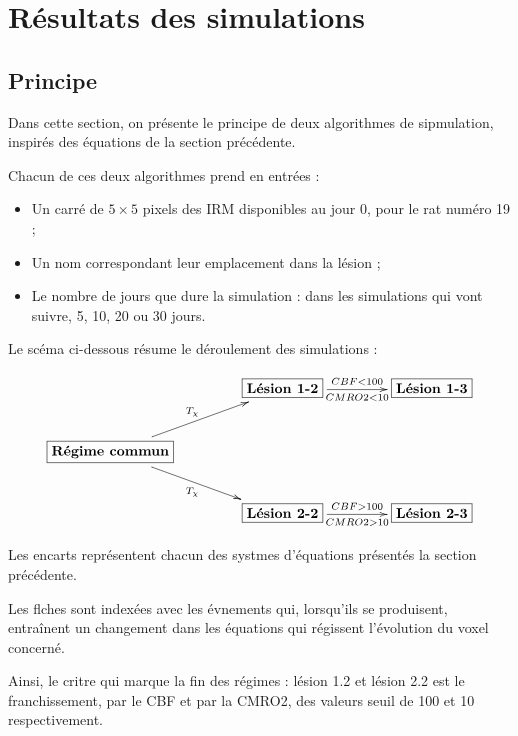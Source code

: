 \section{R\'esultats des simulations}

\subsection{Principe}

Dans cette section, on pr\'esente le principe de deux algorithmes de sipmulation, %
inspir\'es des \'equations de la section pr\'ec\'edente.

\par
Chacun de ces deux algorithmes prend en entrées :
\begin{itemize}
\item Un carr\'e de $5\times 5$ pixels des IRM disponibles au jour 0, pour le rat num\'ero 19 ;
\item Un nom correspondant  leur emplacement dans la l\'esion ;
\item Le nombre de jours que dure la simulation : dans les simulations qui vont suivre, 5, 10, 20 ou 30 jours.
\end{itemize}

Le sc\'ema ci-dessous r\'esume le d\'eroulement des simulations :

\[%
\xymatrixcolsep{1.5cm}%
\xymatrix{%
&%
\fbox{\text{\textbf{L\'esion 1-2}}}\ar[r]^{\scriptstyle CBF<100}_{\scriptstyle CMRO2<10}&%
\fbox{\text{\textbf{L\'esion 1-3}}}%
%
\\
\fbox{\text{\textbf{R\'egime commun}}}\ar[ru]^{T_{\chi}}\ar[rd]_{T_{\chi}}&%
&%
%
\\
&%
\fbox{\text{\textbf{L\'esion 2-2}}}\ar[r]^{\scriptstyle CBF>100}_{\scriptstyle CMRO2>10}&%
\fbox{\text{\textbf{L\'esion 2-3}}}%
}
\]

Les encarts repr\'esentent chacun des systmes d'\'equations pr\'esent\'es  la section pr\'ec\'edente.

\par
Les flches sont index\'ees avec les \'evnements qui, %
lorsqu'ils se produisent, entra\^inent un changement dans les \'equations qui r\'egissent l'\'evolution du voxel concern\'e.

\par
Ainsi, le critre qui marque la fin des r\'egimes : %
\og{} l\'esion 1.2\fg{} et \og{} l\'esion 2.2\fg{} est le franchissement, par le CBF et par la CMRO2, %
des valeurs seuil de 100 et 10 respectivement.

